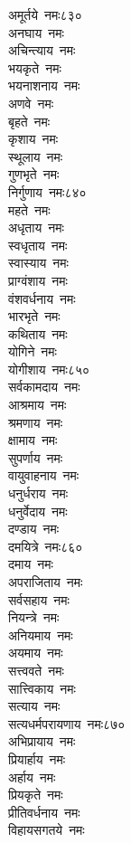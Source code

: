 \begin{multicols}{\maxColumns}
\begin{flushleft}
अमूर्तये~नमः\hfill ८३०\\
अनघाय~नमः\\
अचिन्त्याय~नमः\\
भयकृते~नमः\\
भयनाशनाय~नमः\\
अणवे~नमः\\
बृहते~नमः\\
कृशाय~नमः\\
स्थूलाय~नमः\\
गुणभृते~नमः\\
निर्गुणाय~नमः\hfill ८४०\\
महते~नमः\\
अधृताय~नमः\\
स्वधृताय~नमः\\
स्वास्याय~नमः\\
प्राग्वंशाय~नमः\\
वंशवर्धनाय~नमः\\
भारभृते~नमः\\
कथिताय~नमः\\
योगिने~नमः\\
योगीशाय~नमः\hfill ८५०\\
सर्वकामदाय~नमः\\
आश्रमाय~नमः\\
श्रमणाय~नमः\\
क्षामाय~नमः\\
सुपर्णाय~नमः\\
वायुवाहनाय~नमः\\
धनुर्धराय~नमः\\
धनुर्वेदाय~नमः\\
दण्डाय~नमः\\
दमयित्रे~नमः\hfill ८६०\\
दमाय~नमः\\
अपराजिताय~नमः\\
सर्वसहाय~नमः\\
नियन्त्रे~नमः\\
अनियमाय~नमः\\
अयमाय~नमः\\
सत्त्ववते~नमः\\
सात्त्विकाय~नमः\\
सत्याय~नमः\\
सत्यधर्मपरायणाय~नमः\hfill ८७०\\
अभिप्रायाय~नमः\\
प्रियार्हाय~नमः\\
अर्हाय~नमः\\
प्रियकृते~नमः\\
प्रीतिवर्धनाय~नमः\\
विहायसगतये~नमः\\

\end{flushleft}
\end{multicols}
